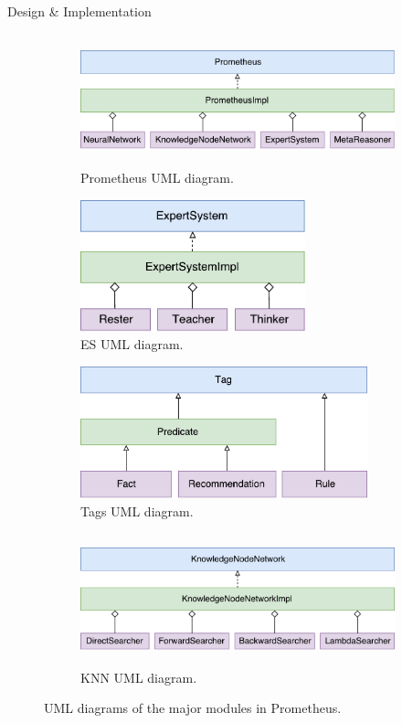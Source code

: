 \documentclass[final]{beamer} %
\begin{document}
\begin{frame}
\begin{columns}
\begin{column}{.34\textwidth}
{\begin{block}{Design \& Implementation}
					\begin{figure}
						\raggedleft
						\begin{subfigure}[b]{0.49\textwidth}
							\centering
							\includegraphics[height=1.5in]{figures/uml_prometheus.pdf}
							\caption{Prometheus UML diagram.}
						\end{subfigure}
						\begin{subfigure}[b]{0.49\textwidth}
							\centering
							\includegraphics[height=1.5in]{figures/uml_es.pdf}
							\caption{ES UML diagram.}
						\end{subfigure}
						\bigskip
						\begin{subfigure}[b]{0.49\textwidth}
							\centering
							\includegraphics[height=1.5in]{figures/uml_tags.pdf}
							\caption{Tags UML diagram.}
						\end{subfigure}
						\begin{subfigure}[b]{0.49\textwidth}
							\centering
							\includegraphics[height=1.5in]{figures/uml_knn.pdf}
							\caption{KNN UML diagram.}
						\end{subfigure}
						\caption{UML diagrams of the major modules in Prometheus.}
					\end{figure}
					

\end{block}}
\end{column}
\end{columns}
\end{frame}
\end{document}
